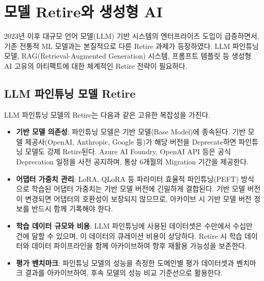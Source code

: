 \section{모델 Retire와 생성형 AI}
\label{sec:12.3b}

2023년 이후 대규모 언어 모델(LLM) 기반 시스템의 엔터프라이즈 도입이 급증하면서, 기존 전통적 ML 모델과는 본질적으로 다른 Retire 과제가 등장하였다. LLM 파인튜닝 모델, RAG(Retrieval-Augmented Generation) 시스템, 프롬프트\cite{openai2023gpt4} 템플릿 등 생성형 AI 고유의 아티팩트에 대한 체계적인 Retire 전략이 필요하다.

\subsection{LLM 파인튜닝 모델 Retire}
\label{sec:12.3b.1}

LLM 파인튜닝 모델의 Retire는 다음과 같은 고유한 복잡성을 가진다.

\begin{itemize}
 \item \textbf{기반 모델 의존성}: 파인튜닝 모델은 기반 모델(Base Model)에 종속된다. 기반 모델 제공사(OpenAI, Anthropic, Google 등)가 해당 버전을 Deprecate하면 파인튜닝 모델도 강제 Retire된다. Azure AI Foundry, OpenAI API 등은 공식 Deprecation 일정을 사전 공지하며, 통상 6개월의 Migration 기간을 제공한다.
 \item \textbf{어댑터 가중치 관리}: LoRA, QLoRA 등 파라미터 효율적 파인튜닝(PEFT) 방식으로 학습된 어댑터 가중치는 기반 모델 버전에 긴밀하게 결합된다. 기반 모델 버전이 변경되면 어댑터의 호환성이 보장되지 않으므로, 아카이브 시 기반 모델 버전 정보를 반드시 함께 기록해야 한다.
 \item \textbf{학습 데이터 규모와 비용}: LLM 파인튜닝에 사용된 데이터셋은 수만에서 수십만 건에 달할 수 있으며, 이 데이터의 큐레이션 비용이 상당하다. Retire 시 학습 데이터와 데이터 파이프라인을 함께 아카이브하여 향후 재활용 가능성을 보존한다.
 \item \textbf{평가 벤치마크}: 파인튜닝 모델의 성능을 측정한 도메인별 평가 데이터셋과 벤치마크 결과를 아카이브하여, 후속 모델의 성능 비교 기준선으로 활용한다.
\end{itemize}

